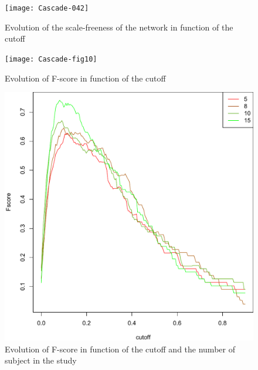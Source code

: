 \documentclass[a4paper]{article}
\begin{document}
\newpage






\begin{figure}
\centering
\texttt{[image: Cascade-042]}
\caption{Evolution of the scale-freeness of the network in function of the cutoff} \label{pred21}
\texttt{[image: Cascade-fig10]}
\caption{Evolution of F-score in function of the cutoff} \label{pred23}
\end{figure}



\begin{figure}
\centering
\includegraphics{subject_evol}
\caption{Evolution of F-score in function of the cutoff and the number of subject in the study} \label{pred22}
\end{figure}

\newpage
\clearpage

 
\end{document}
